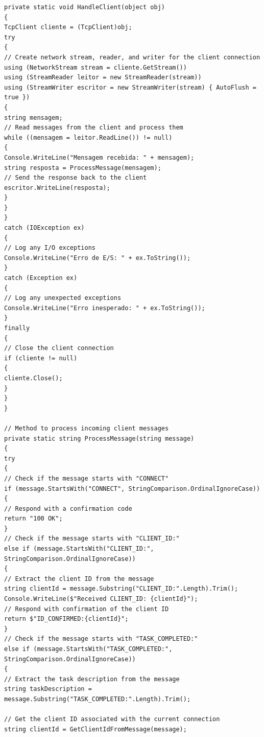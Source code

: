\documentclass[12pt]{article}
\begin{document}
\begin{verbatim}
private static void HandleClient(object obj)
{
TcpClient cliente = (TcpClient)obj;
try
{
// Create network stream, reader, and writer for the client connection
using (NetworkStream stream = cliente.GetStream())
using (StreamReader leitor = new StreamReader(stream))
using (StreamWriter escritor = new StreamWriter(stream) { AutoFlush = true })
{
string mensagem;
// Read messages from the client and process them
while ((mensagem = leitor.ReadLine()) != null)
{
Console.WriteLine("Mensagem recebida: " + mensagem);
string resposta = ProcessMessage(mensagem);
// Send the response back to the client
escritor.WriteLine(resposta);
}
}
}
catch (IOException ex)
{
// Log any I/O exceptions
Console.WriteLine("Erro de E/S: " + ex.ToString());
}
catch (Exception ex)
{
// Log any unexpected exceptions
Console.WriteLine("Erro inesperado: " + ex.ToString());
}
finally
{
// Close the client connection
if (cliente != null)
{
cliente.Close();
}
}
}

// Method to process incoming client messages
private static string ProcessMessage(string message)
{
try
{
// Check if the message starts with "CONNECT"
if (message.StartsWith("CONNECT", StringComparison.OrdinalIgnoreCase))
{
// Respond with a confirmation code
return "100 OK";
}
// Check if the message starts with "CLIENT_ID:"
else if (message.StartsWith("CLIENT_ID:", StringComparison.OrdinalIgnoreCase))
{
// Extract the client ID from the message
string clientId = message.Substring("CLIENT_ID:".Length).Trim();
Console.WriteLine($"Received CLIENT_ID: {clientId}");
// Respond with confirmation of the client ID
return $"ID_CONFIRMED:{clientId}";
}
// Check if the message starts with "TASK_COMPLETED:"
else if (message.StartsWith("TASK_COMPLETED:", StringComparison.OrdinalIgnoreCase))
{
// Extract the task description from the message
string taskDescription = message.Substring("TASK_COMPLETED:".Length).Trim();

// Get the client ID associated with the current connection
string clientId = GetClientIdFromMessage(message);


\end{verbatim}
\end{document}
